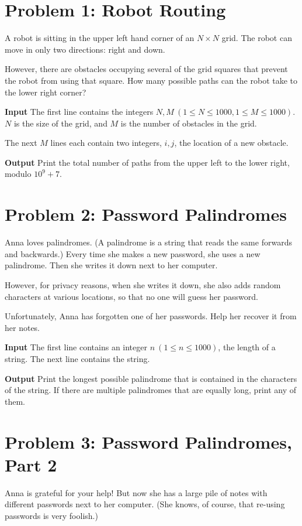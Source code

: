 \normalfont\documentclass[letterpaper,11pt]{article}
\begin{document}
\section*{Problem 1: Robot Routing}
A robot is sitting in the upper left hand corner of an $N \times N$ grid. The robot can move in only two directions: right and down.

However, there are obstacles occupying several of the grid squares that prevent the robot from using that square. How many possible paths can the robot take to the lower right corner?

\textbf{Input} \newline
The first line contains the integers $N, M \ (1 \leq N \leq 1000, 1 \leq M \leq 1000)$. $N$ is the size of the grid, and $M$ is the number of obstacles in the grid.

The next $M$ lines each contain two integers, $i, j$, the location of a new obstacle.

\textbf{Output} \newline
Print the total number of paths from the upper left to the lower right, modulo $10^9 + 7$.

\newpage

\section*{Problem 2: Password Palindromes}
Anna loves palindromes. (A palindrome is a string that reads the same forwards and backwards.) Every time she makes a new password, she uses a new palindrome. Then she writes it down next to her computer.

However, for privacy reasons, when she writes it down, she also adds random characters at various locations, so that no one will guess her password.

Unfortunately, Anna has forgotten one of her passwords. Help her recover it from her notes.

\textbf{Input} \newline
The first line contains an integer $n \ (1 \leq n \leq 1000)$, the length of a string. The next line contains the string.

\textbf{Output} \newline
Print the longest possible palindrome that is contained in the characters of the string. If there are multiple palindromes that are equally long, print any of them.

\newpage

\section*{Problem 3: Password Palindromes, Part 2}
Anna is grateful for your help! But now she has a large pile of notes with different passwords next to her computer. (She knows, of course, that re-using passwords is very foolish.)
\end{document}
